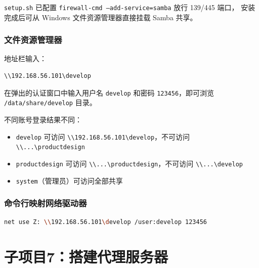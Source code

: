 \documentclass[12pt,a4paper]{ctexart}
\begin{document}
\texttt{setup.sh} 已配置 \texttt{firewall-cmd --add-service=samba} 放行 139/445 端口，
安装完成后可从 Windows 文件资源管理器直接挂载 Samba 共享。

\subsubsection{文件资源管理器}

地址栏输入：

\begin{cmdbox}
\begin{lstlisting}[language=bash,numbers=none]
\\192.168.56.101\develop
\end{lstlisting}
\end{cmdbox}

在弹出的认证窗口中输入用户名 \texttt{develop} 和密码 \texttt{123456}，即可浏览 \texttt{/data/share/develop} 目录。

不同账号登录结果不同：

\begin{itemize}
  \item \texttt{develop} 可访问 \texttt{\textbackslash\textbackslash 192.168.56.101\textbackslash develop}，不可访问 \texttt{\textbackslash\textbackslash ...\textbackslash productdesign}
  \item \texttt{productdesign} 可访问 \texttt{\textbackslash\textbackslash ...\textbackslash productdesign}，不可访问 \texttt{\textbackslash\textbackslash ...\textbackslash develop}
  \item \texttt{system}（管理员）可访问全部共享
\end{itemize}

\subsubsection{命令行映射网络驱动器}

\begin{cmdbox}
\begin{lstlisting}[language=bash,numbers=none]
net use Z: \\192.168.56.101\develop /user:develop 123456
\end{lstlisting}
\end{cmdbox}

\newpage
\section{子项目7：搭建代理服务器}
\end{document}
